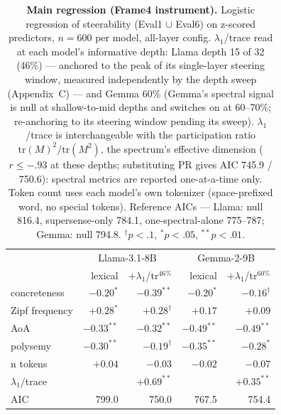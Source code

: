 \documentclass[11pt]{article}
\begin{document}
\begin{table}[t]
\centering
\small
\setlength{\tabcolsep}{4pt}
\begin{tabular}{lrrrr}
\hline
 & \multicolumn{2}{c}{Llama-3.1-8B} & \multicolumn{2}{c}{Gemma-2-9B} \\
 & lexical & $+\lambda_1$/tr$^{46\%}$ & lexical & $+\lambda_1$/tr$^{60\%}$ \\
\hline
concreteness   & $-0.20^{*}$  & $-0.39^{**}$ & $-0.20^{*}$  & $-0.16^{\dagger}$ \\
Zipf frequency & $+0.28^{*}$  & $+0.28^{\dagger}$ & $+0.17$ & $+0.09$ \\
AoA            & $-0.33^{**}$ & $-0.32^{**}$ & $-0.49^{**}$ & $-0.49^{**}$ \\
polysemy       & $-0.30^{**}$ & $-0.19^{\dagger}$ & $-0.35^{**}$ & $-0.28^{*}$ \\
n tokens       & $+0.04$      & $-0.03$      & $-0.02$      & $-0.07$ \\
$\lambda_1$/trace &           & $+0.69^{**}$ &              & $+0.35^{**}$ \\
\hline
AIC            & 799.0        & 750.0        & 767.5        & 754.4 \\
\hline
\end{tabular}
\caption{\textbf{Main regression (Frame4 instrument).} Logistic regression of
steerability (Eval1 $\cup$ Eval6) on z-scored predictors, $n{=}600$ per model, all-layer
config. $\lambda_1$/trace read at each model's informative depth: Llama depth 15
of 32 (46\%) --- anchored to the peak of its single-layer steering window,
measured independently by the depth sweep (Appendix~C) --- and Gemma 60\%
(Gemma's spectral signal is null at shallow-to-mid depths and switches on at
60--70\%; re-anchoring to its steering window pending its sweep).
$\lambda_1$/trace is interchangeable with the participation ratio
$\mathrm{tr}(M)^2/\mathrm{tr}(M^2)$, the spectrum's effective dimension
($r \le -.93$ at these depths; substituting PR gives AIC 745.9 / 750.6): spectral
metrics are reported one-at-a-time only. Token count uses each model's own
tokenizer (space-prefixed word, no special tokens). Reference AICs --- Llama:
null 816.4, supersense-only 784.1, one-spectral-alone 775--787; Gemma: null 794.8.
$^{\dagger}p{<}.1$, $^{*}p{<}.05$, $^{**}p{<}.01$.}
\label{tab:reg600v4}
\end{table}
\end{document}
